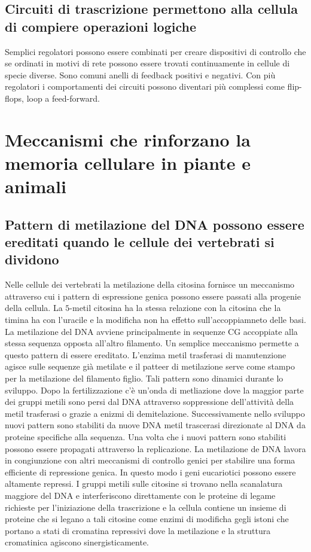 \subsection{Circuiti di trascrizione permettono alla cellula di compiere operazioni logiche}
Semplici regolatori possono essere combinati per creare dispositivi di controllo che se ordinati in motivi di rete possono essere trovati continuamente in cellule di specie diverse. 
Sono comuni anelli di feedback positivi e negativi. Con pi\`u regolatori i comportamenti dei circuiti possono diventari pi\`u complessi come flip-flops, loop a feed-forward. 
\section{Meccanismi che rinforzano la memoria cellulare in piante e animali}
\subsection{Pattern di metilazione del DNA possono essere ereditati quando le cellule dei vertebrati si dividono}
Nelle cellule dei vertebrati la metilazione della citosina fornisce un meccanismo attraverso cui i pattern di espressione genica possono essere passati alla progenie della cellula. La
$5$-metil citosina ha la stessa relazione con la citosina che la timina ha con l'uracile e la modificha non ha effetto sull'accoppiamneto delle basi. La metilazione del DNA avviene 
principalmente in sequenze CG accoppiate alla stessa sequenza opposta all'altro filamento. Un semplice meccanismo permette a questo pattern di essere ereditato. L'enzima metil trasferasi
di manutenzione agisce sulle sequenze gi\`a metilate e il patteer di metilazione serve come stampo per la metilazione del filamento figlio. Tali pattern sono dinamici durante lo 
sviluppo. Dopo la fertilizzazione c'\`e un'onda di metliazione dove la maggior parte dei gruppi metili sono persi dal DNA attraverso soppressione dell'attivit\`a della metil trasferasi o
grazie a enizmi di demitelazione. Successivamente nello sviluppo nuovi pattern sono stabiliti da nuove DNA metil trascerasi direzionate al DNA da proteine specifiche alla sequenza.
Una volta che i nuovi pattern sono stabiliti possono essere propagati attraverso la replicazione. La metilazione de DNA lavora in congiunzione con altri meccanismi di controllo genici
per stabilire una forma efficiente di repressione genica. In questo modo i geni eucariotici possono essere altamente repressi. I gruppi metili sulle citosine si trovano nella scanalatura
maggiore del DNA e interferiscono direttamente con le proteine di legame richieste per l'iniziazione della trascrizione e la cellula contiene un insieme di proteine che si legano a tali
citosine come enzimi di modificha gegli istoni che portano a stati di cromatina repressivi dove la metilazione e la struttura cromatinica agiscono sinergisticamente.
